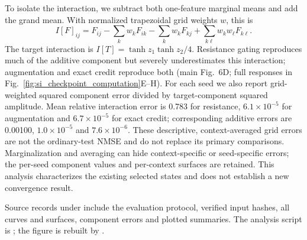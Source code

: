 To isolate the interaction, we subtract both one-feature marginal means and add the grand mean. With normalized trapezoidal grid weights $w$, this is
\[
I[F]_{ij}=F_{ij}-\sum_k w_kF_{ik}-\sum_k w_kF_{kj}+\sum_{k\ell}w_kw_\ell F_{k\ell}.
\]
The target interaction is $I[T]=\tanh z_1\tanh z_2/4$. Resistance gating reproduces much of the additive component but severely underestimates this interaction; augmentation and exact credit reproduce both (main Fig.~6D; full responses in Fig.~\ref{fig:si_checkpoint_computation}E--H). For each seed we also report grid-weighted squared component error divided by target-component squared amplitude. Mean relative interaction error is 0.783 for resistance, $6.1\times10^{-5}$ for augmentation and $6.7\times10^{-5}$ for exact credit; corresponding additive errors are 0.00100, $1.0\times10^{-5}$ and $7.6\times10^{-6}$. These descriptive, context-averaged grid errors are not the ordinary-test NMSE and do not replace its primary comparisons. Marginalization and averaging can hide context-specific or seed-specific errors; the per-seed component values and per-context surfaces are retained. This analysis characterizes the existing selected states and does not establish a new convergence result.

Source records under  include the evaluation protocol, verified input hashes, all curves and surfaces, component errors and plotted summaries. The analysis script is ; the figure is rebuilt by .

